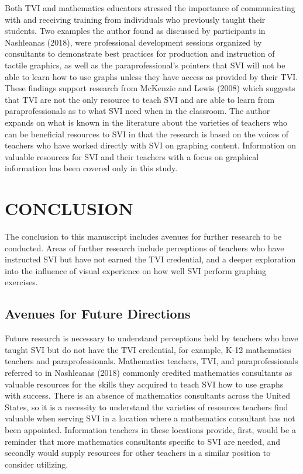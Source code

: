 \documentclass[11.5pt]{sig-alternate} %
\begin{document}
\begin{large}
Both TVI and mathematics educators stressed the importance of communicating with and receiving training from individuals who previously taught their students. Two examples the author found as discussed by participants in Nashleanas (2018), were professional development sessions organized by consultants to demonstrate best practices for production and instruction of tactile graphics, as well as the paraprofessional’s pointers that SVI will not be able to learn how to use graphs unless they have access as provided by their TVI. These findings support research from McKenzie and Lewis (2008) which suggests that TVI are not the only resource to teach SVI and are able to learn from paraprofessionals as to what SVI need when in the classroom. The author expands on what is known in the literature about the varieties of teachers who can be beneficial resources to SVI in that the research is based on the voices of teachers who have worked directly with SVI on graphing content. Information on valuable resources for SVI and their teachers with a focus on graphical information has been covered only in this study.
 
\section*{CONCLUSION}

The conclusion to this manuscript includes avenues for further research to be conducted. Areas of further research include perceptions of teachers who have instructed SVI but have not earned the TVI credential, and a deeper exploration into the influence of visual experience on how well SVI perform graphing exercises. 
 
\subsection*{Avenues for Future Directions}

Future research is necessary to understand perceptions held by teachers who have taught SVI but do not have the TVI credential, for example, K-12 mathematics teachers and paraprofessionals. Mathematics teachers, TVI, and paraprofessionals referred to in Nashleanas (2018) commonly credited mathematics consultants as valuable resources for the skills they acquired to teach SVI how to use graphs with success. There is an absence of mathematics consultants across the United States, so it is a necessity to understand the varieties of resources teachers find valuable when serving SVI in a location where a mathematics consultant has not been appointed. Information teachers in these locations provide, first, would be a reminder that more mathematics consultants specific to SVI are needed, and secondly would supply resources for other teachers in a similar position to consider utilizing.
 

\end{large}
\end{document}
